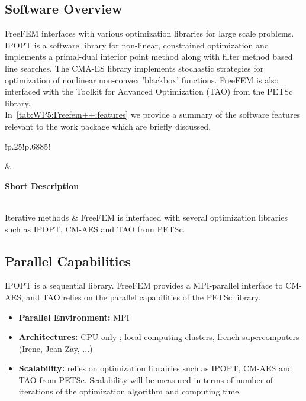\subsection{Software Overview}
\label{sec:WP5:Freefem++:summary}

FreeFEM interfaces with various optimization libraries for large scale problems. IPOPT is a software library for non-linear, constrained optimization and implements a primal-dual interior point method along with filter method based line searches. The CMA-ES library implements stochastic strategies for optimization of nonlinear non-convex 'blackbox' functions. FreeFEM is also interfaced with the Toolkit for Advanced Optimization (TAO) from the PETSc library.\\

In~\cref{tab:WP5:Freefem++:features} we provide a summary of the software features relevant to the work package which are briefly discussed.

\begin{table}[h!]
    \centering
    { 
        \setlength{\parindent}{0pt}
        \def\arraystretch{1.25}
        {
            \fontsize{9}{11}\selectfont
            \begin{tabular}{!{\color{numpexgray}\vrule}p{.25\linewidth}!{\color{numpexgray}\vrule}p{.6885\linewidth}!{\color{numpexgray}\vrule}}
    
     &  {\rule{0pt}{2.5ex}\color{white}\bf Short Description }\\ 
    
    Iterative methods & FreeFEM is interfaced with several optimization libraries such as IPOPT, CM-AES and TAO from PETSc.\\
\end{tabular}
        }
    }
    \caption{WP5: Freefem++ Features}
    \label{tab:WP5:Freefem++:features}
\end{table}


\subsection{Parallel Capabilities}
\label{sec:WP5:Freefem++:performances}

IPOPT is a sequential library. FreeFEM provides a MPI-parallel interface to CM-AES, and TAO relies on the parallel capabilities of the PETSc library.

\begin{itemize}
    \item \textbf{Parallel Environment:} MPI

    \item \textbf{Architectures:} CPU only ; local computing clusters, french supercomputers (Irene, Jean Zay, ...)
 
    \item \textbf{Scalability:} relies on optimization librairies such as IPOPT, CM-AES and TAO from PETSc. Scalability will be measured in terms of number of iterations of the optimization algorithm and computing time.
\end{itemize}


